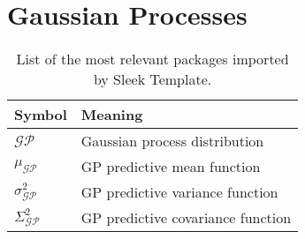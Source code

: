 \section{Gaussian Processes}

\newcommand{\GP}[0]{\mathcal{GP}}
\newcommand{\gpmean}[0]{\mu_{\GP}}
\newcommand{\gpvar}[0]{\sigma_{\GP}^2}
\newcommand{\gpcovar}[0]{\Sigma_{\GP}^2}


\begin{table}[h]
    \centering
    \begin{tabular}{ll}
        \toprule
        \textbf{Symbol} & \textbf{Meaning} \\
        \midrule
        $\GP$ & Gaussian process distribution \\
        $\gpmean$ & GP predictive mean function \\
        $\gpvar$ & GP predictive variance function \\
        $\gpcovar$ & GP predictive covariance function \\
        \bottomrule
    \end{tabular}
    \caption{List of the most relevant packages imported by Sleek Template.}
    \label{tab:sleek_relevant_packages}
\end{table}